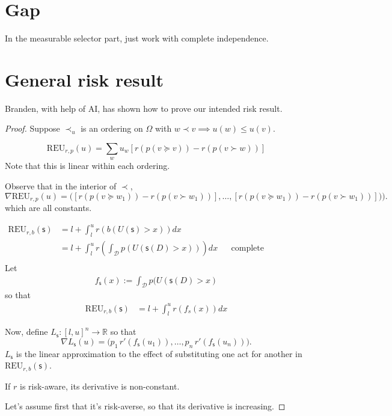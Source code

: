 \documentclass[a4paper,final]{article}
\newcommand\REU{\mathrm{REU}}
\newcommand{\Decs}{\mathcal{D}}
\newcommand\s{\mathsf{s}}
\renewcommand{\Re}{\mathbb{R}}
\renewcommand{\leq}{\leqslant}
\newenvironment{CCM rewritten}
{\begingroup\color{blue}} %
{\endgroup}              %
\begin{document}
\section{Gap}
In the measurable selector part, just work with complete independence. 

\section{General risk result}
Branden, with help of AI, has shown how to prove our intended risk result. 




		\newcommand{\curlyl}{\prec}
		\newcommand{\curlyleq}{\preceq}
		\newcommand{\curlygeq}{\succeq}
		\newcommand{\curlyg}{\succ}
		\newcommand{\curlyeq}{\approx}
		\newcommand{\curlylneq}{\precnsim}
\newcommand{\curlygneq}{\succnsim}


\begin{proof}

Suppose $\curlyl_u$ is an ordering on $\Omega$ with $w\curlyl v\implies u(w)\leq u(v)$.

$$\REU_{r,p}(u)= \sum_w u_w\left[r(p(v\curlygeq v))-r(p(v\curlyg w))\right]$$
Note that this is linear within each ordering. 

Observe that in the interior of $\curlyl$, 
\[
\nabla \REU_{r,p}(u)
=
\bigl(\left[r(p(v\curlygeq w_1))-r(p(v\curlyg w_1))\right],\ldots, \left[r(p(v\curlygeq w_1))-r(p(v\curlyg w_1))\right])\bigr).
\]
which are all constants.


\begin{align}
\REU_{r,b}(\s)&=l+\int_l^u r(b(U(\s)>x))dx\\
&=l+\int_l^u r\left(\int_\Decs p(U(\s(D)>x))\right)dx&&\text{complete independence}\\
\end{align}
Let \begin{align}
f_\s(x):=\int_\Decs p(U(\s(D)>x)
\end{align}
so that 
\begin{align}
\REU_{r,b}(\s)
&=l+\int_l^u r(f_s(x))dx
\end{align}

Now, define $L_\s:[l,u]^n\to\Re$ so that
\[
\nabla L_\s(u)
=
\bigl(p_1\, r'(f_\s(u_1)),\ldots,p_n\,r'(f_\s(u_n))\bigr).
\]
$L_\s$ is the linear approximation to the effect of substituting one act for another in $\REU_{r,b}(\s)$.  

If $r$ is risk-aware, its derivative is non-constant. 

Let's assume first that it's risk-averse, so that its derivative is increasing. 




\end{proof}
\end{document}
